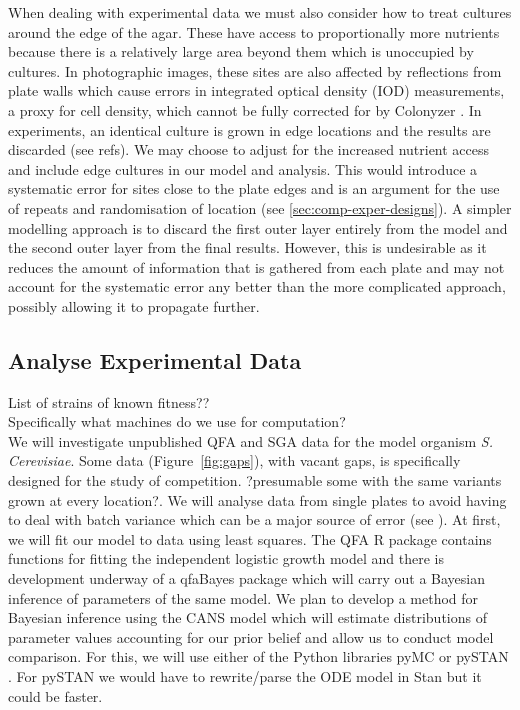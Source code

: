 When dealing with experimental data we must also consider how to treat
cultures around the edge of the agar. These have access to
proportionally more nutrients because there is a relatively large area
beyond them which is unoccupied by cultures. In photographic images,
these sites are also affected by reflections from plate walls which
cause errors in integrated optical density (IOD) measurements, a proxy
for cell density, which cannot be fully corrected for by Colonyzer
\citep{Lawless2010}. In experiments, an identical culture is grown in
edge locations and the results are discarded (see refs). We may choose
to adjust for the increased nutrient access and include edge cultures
in our model and analysis. This would introduce a systematic error for
sites close to the plate edges and is an argument for the use of
repeats and randomisation of location (see
\ref{sec:comp-exper-designs}). A simpler modelling approach is to
discard the first outer layer entirely from the model and the second
outer layer from the final results. However, this is undesirable as it
reduces the amount of information that is gathered from each plate and
may not account for the systematic error any better than the more
complicated approach, possibly allowing it to propagate further.

\subsection{Analyse Experimental Data}
\label{sec:analyse-data}

List of strains of known fitness??\\
Specifically what machines do we use for computation?\\

We will investigate unpublished QFA and SGA data for the model
organism \textit{S. Cerevisiae}. Some data (Figure~\ref{fig:gaps}),
with vacant gaps, is specifically designed for the study of
competition. ?presumable some with the same variants grown at every
location?. We will analyse data from single plates to avoid having to
deal with batch variance which can be a major source of error (see
\citet{Baryshnikova2010}). At first, we will fit our model to data
using least squares. The QFA R package \citep{qfa2016} contains
functions for fitting the independent logistic growth model and there
is development underway of a qfaBayes package which will carry out a
Bayesian inference of parameters of the same model. We plan to develop
a method for Bayesian inference using the CANS model which will
estimate distributions of parameter values accounting for our prior
belief and allow us to conduct model comparison. For this, we will use
either of the Python libraries pyMC \citep{PyMC2010} or pySTAN
\citep{Stan}. For pySTAN we would have to rewrite/parse the ODE model
in Stan but it could be faster.

